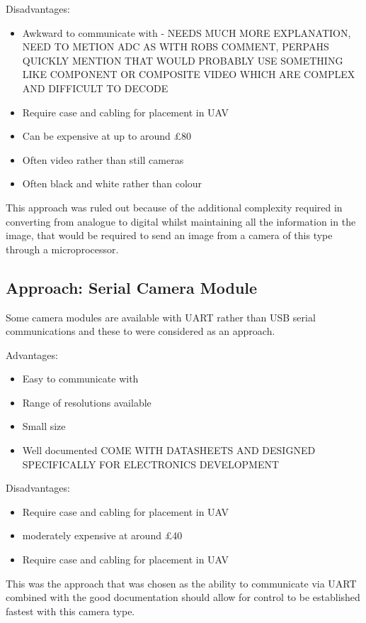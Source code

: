 Disadvantages:
     \begin{itemize}
        \item Awkward to communicate with - NEEDS MUCH MORE EXPLANATION, NEED TO METION ADC AS WITH ROBS COMMENT, PERPAHS QUICKLY MENTION THAT WOULD PROBABLY USE SOMETHING LIKE COMPONENT OR COMPOSITE VIDEO WHICH ARE COMPLEX AND DIFFICULT TO DECODE
        \item Require case and cabling for placement in UAV
		\item Can be expensive at up to around \pounds 80
		\item Often video rather than still cameras
		\item Often black and white rather than colour
     \end{itemize}

This approach was ruled out because of the additional complexity required in converting from analogue to digital whilst maintaining all the information in the image, that would be required to send an image from a camera of this type through a microprocessor.

\subsection{Approach: Serial Camera Module}
\label{sec:Serial_option}
Some camera modules are available with UART rather than USB serial communications and these to were considered as an approach.

Advantages:
      \begin{itemize}
		 \item Easy to communicate with
         \item Range of resolutions available
		 \item Small size
		 \item Well documented COME WITH DATASHEETS AND DESIGNED SPECIFICALLY FOR ELECTRONICS DEVELOPMENT
     \end{itemize}

Disadvantages:
     \begin{itemize}
        \item Require case and cabling for placement in UAV
	\item moderately expensive at around \pounds 40
        \item Require case and cabling for placement in UAV
     \end{itemize}

This was the approach that was chosen as the ability to communicate via UART combined with the good documentation should allow for control to be established fastest with this camera type.

